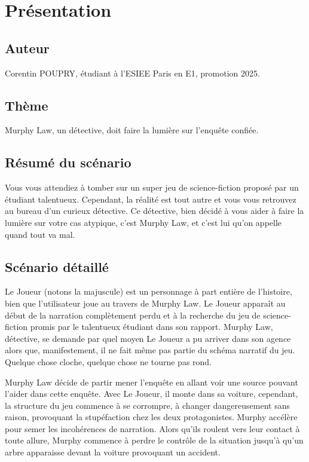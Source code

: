 \chapter{Présentation}

\section{Auteur}

\noindent
Corentin POUPRY, étudiant à l'ESIEE Paris en E1, promotion 2025.

\section{Thème}

\noindent
Murphy Law, un détective, doit faire la lumière sur l'enquête confiée.

\section{Résumé du scénario}

Vous vous attendiez à tomber sur un super jeu de science-fiction proposé par un étudiant talentueux. Cependant, la réalité est tout autre et vous vous retrouvez au bureau d'un curieux détective. Ce détective, bien décidé à vous aider à faire la lumière sur votre cas atypique, c'est Murphy Law, et c'est lui qu'on appelle quand tout va mal.

\section{Scénario détaillé}

Le Joueur (notons la majuscule) est un personnage à part entière de l'histoire, bien que l'utilisateur joue au travers de Murphy Law. Le Joueur apparaît au début de la narration complètement perdu et à la recherche du jeu de science-fiction promis par le talentueux étudiant dans son rapport. Murphy Law, détective, se demande par quel moyen Le Joueur a pu arriver dans son agence alors que, manifestement, il ne fait même pas partie du schéma narratif du jeu. Quelque chose cloche, quelque chose ne tourne pas rond.

Murphy Law décide de partir mener l'enquête en allant voir une source pouvant l'aider dans cette enquête. Avec Le Joueur, il monte dans sa voiture, cependant, la structure du jeu commence à se corrompre, à changer dangereusement sans raison, provoquant la stupéfaction chez les deux protagonistes. Murphy accélère pour semer les incohérences de narration. Alors qu'ils roulent vers leur contact à toute allure, Murphy commence à perdre le contrôle de la situation jusqu'à qu'un arbre apparaisse devant la voiture provoquant un accident.

